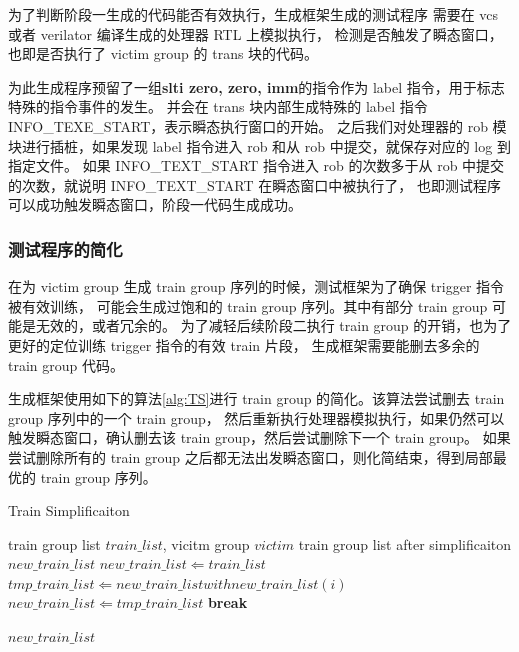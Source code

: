 为了判断阶段一生成的代码能否有效执行，生成框架生成的测试程序
需要在 vcs 或者 verilator 编译生成的处理器 RTL 上模拟执行，
检测是否触发了瞬态窗口，也即是否执行了 victim group 的 trans 块的代码。\par

为此生成程序预留了一组\textbf{slti zero, zero, imm}的指令作为 label 指令，用于标志特殊的指令事件的发生。
并会在 trans 块内部生成特殊的 label 指令 INFO\_TEXE\_START，表示瞬态执行窗口的开始。
之后我们对处理器的 rob 模块进行插桩，如果发现 label 指令进入 rob 和从 rob 中提交，就保存对应的 log 到指定文件。
如果 INFO\_TEXT\_START 指令进入 rob 的次数多于从 rob 中提交的次数，就说明 INFO\_TEXT\_START 在瞬态窗口中被执行了，
也即测试程序可以成功触发瞬态窗口，阶段一代码生成成功。

\subsubsection{测试程序的简化}

在为 victim group 生成 train group 序列的时候，测试框架为了确保 trigger 指令被有效训练，
可能会生成过饱和的 train group 序列。其中有部分 train group 可能是无效的，或者冗余的。
为了减轻后续阶段二执行 train group 的开销，也为了更好的定位训练 trigger 指令的有效 train 片段，
生成框架需要能删去多余的 train group 代码。\par

生成框架使用如下的算法\ref{alg:TS}进行 train group 的简化。该算法尝试删去 train group 序列中的一个 train group，
然后重新执行处理器模拟执行，如果仍然可以触发瞬态窗口，确认删去该 train group，然后尝试删除下一个 train group。
如果尝试删除所有的 train group 之后都无法出发瞬态窗口，则化简结束，得到局部最优的 train group 序列。\par

\begin{algorithm}[!h]
    \caption{Train Simplificaiton}
    \label{alg:TS}
    \renewcommand{\algorithmicrequire}{\textbf{Input:}}
    \renewcommand{\algorithmicensure}{\textbf{Output:}}
    
    \begin{algorithmic}[1]
        \REQUIRE train group list $train\_list$, vicitm group $victim$  %
        \ENSURE train group list after simplificaiton $new\_train\_list$    %
        \STATE $new\_train\_list \Leftarrow train\_list$
                \STATE $tmp\_train\_list \Leftarrow new\_train\_list with new\_train\_list(i)$
                    \STATE $new\_train\_list \Leftarrow tmp\_train\_list$
                    \textbf{break}
                \ENDIF
            \ENDFOR
        \ENDFOR

        \RETURN $new\_train\_list$
    \end{algorithmic}
\end{algorithm}

